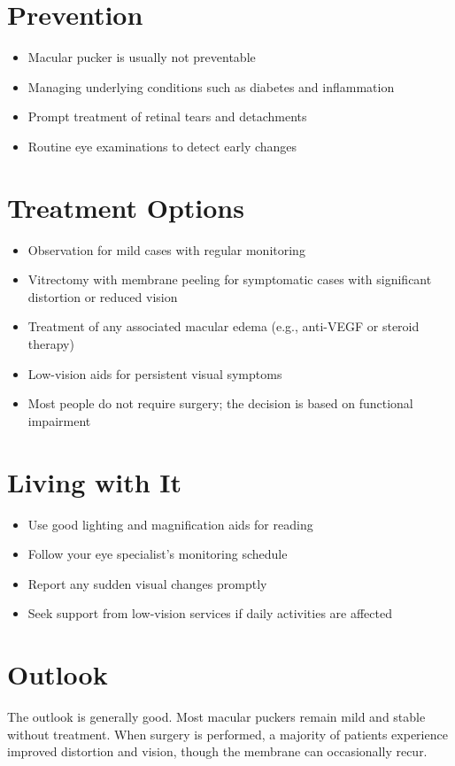 \section{Prevention}
\begin{itemize}[noitemsep]
  \item Macular pucker is usually not preventable
  \item Managing underlying conditions such as diabetes and inflammation
  \item Prompt treatment of retinal tears and detachments
  \item Routine eye examinations to detect early changes
\end{itemize}
\section{Treatment Options}
\begin{itemize}[noitemsep]
  \item Observation for mild cases with regular monitoring
  \item Vitrectomy with membrane peeling for symptomatic cases with significant distortion or reduced vision
  \item Treatment of any associated macular edema (e.g., anti-VEGF or steroid therapy)
  \item Low-vision aids for persistent visual symptoms
  \item Most people do not require surgery; the decision is based on functional impairment
\end{itemize}
\section{Living with It}
\begin{itemize}[noitemsep]
  \item Use good lighting and magnification aids for reading
  \item Follow your eye specialist's monitoring schedule
  \item Report any sudden visual changes promptly
  \item Seek support from low-vision services if daily activities are affected
\end{itemize}
\section{Outlook}
The outlook is generally good. Most macular puckers remain mild and stable without treatment. When surgery is performed, a majority of patients experience improved distortion and vision, though the membrane can occasionally recur.
